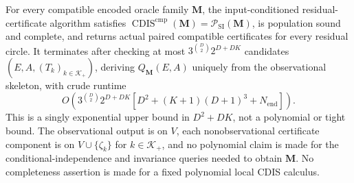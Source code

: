 For every compatible encoded oracle family \(\mathbf M\), the input-conditioned residual-certificate algorithm satisfies \(\operatorname{CDIS}^{\mathrm{cmp}}(\mathbf M)=\mathcal P_{\mathrm{SI}}(\mathbf M)\), is population sound and complete, and returns actual paired compatible certificates for every residual circle.  It terminates after checking at most \(3^{\binom D2}2^{D+DK}\) candidates \((E,A,(T_k)_{k\in\mathcal K_+})\), deriving \(Q_{\mathbf M}(E,A)\) uniquely from the observational skeleton, with crude runtime
\[
O\!\left(3^{\binom D2}2^{D+DK}
\left[D^2+(K+1)(D+1)^3+N_{\mathrm{end}}\right]\right).
\]
This is a singly exponential upper bound in \(D^2+DK\), not a polynomial or tight bound.  The observational output is on \(V\), each nonobservational certificate component is on \(V\cup\{\zeta_k\}\) for \(k\in\mathcal K_+\), and no polynomial claim is made for the conditional-independence and invariance queries needed to obtain \(\mathbf M\).  No completeness assertion is made for a fixed polynomial local CDIS calculus.